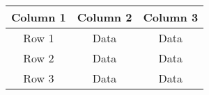 \begin{table}
    \centering
    \begin{tabular}{|c|c|c|}
    \hline
    \textbf{Column 1} & \textbf{Column 2} & \textbf{Column 3} \\
    \hline
    Row 1 & Data & Data \\
    \hline
    Row 2 & Data & Data \\
    \hline
    Row 3 & Data & Data \\
    \hline
    \end{tabular}
\end{table}